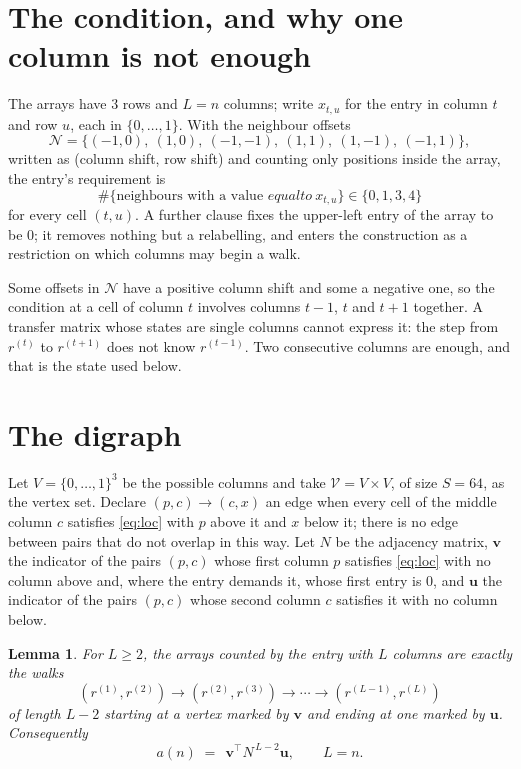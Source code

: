 \documentclass[11pt,a4paper]{article}
\theoremstyle{plain}
\newtheorem{lemma}[theorem]{Lemma}
\theoremstyle{definition}
\begin{document}
\section{The condition, and why one column is not enough}

The arrays have $3$ rows and $L=n$ columns; write $x_{t,u}$ for the entry in
column $t$ and row $u$, each in $\{0,\dots,1\}$. With the neighbour offsets
\[
\mathcal N=\{(-1,0),\ (1,0),\ (-1,-1),\ (1,1),\ (1,-1),\ (-1,1)\},
\]
written as (column shift, row shift) and counting only positions inside the array, the
entry's requirement is
\begin{equation}\label{eq:loc}
\#\{\text{neighbours with a value }equal to\ x_{t,u}\}\in\{0,1,3,4\}
\end{equation}
for every cell $(t,u)$. A further clause fixes the upper-left entry of the array to be $0$; it removes nothing but a relabelling, and enters the construction as a restriction on which columns may begin a walk.

Some offsets in $\mathcal N$ have a positive column shift and some a negative one, so the
condition at a cell of column $t$ involves columns $t-1$, $t$ and $t+1$ together. A transfer
matrix whose states are single columns cannot express it: the step from $r^{(t)}$ to
$r^{(t+1)}$ does not know $r^{(t-1)}$. Two consecutive columns are enough, and that is
the state used below.

\section{The digraph}

Let $V=\{0,\dots,1\}^{3}$ be the possible columns and take
$\mathcal V=V\times V$, of size $S=64$, as the vertex set. Declare $(p,c)\to(c,x)$ an edge
when every cell of the middle column $c$ satisfies \eqref{eq:loc} with $p$ above it and $x$
below it; there is no edge between pairs that do not overlap in this way. Let $N$ be the
adjacency matrix, $\mathbf{v}$ the indicator of the pairs $(p,c)$ whose first column $p$
satisfies \eqref{eq:loc} with no column above and, where the entry demands it, whose first entry is $0$, and $\mathbf{u}$ the indicator of
the pairs $(p,c)$ whose second column $c$ satisfies it with no column below.

\begin{lemma}\label{lem:walk}
For $L\ge2$, the arrays counted by the entry with $L$ columns are exactly the walks
\[
(r^{(1)},r^{(2)})\to(r^{(2)},r^{(3)})\to\cdots\to(r^{(L-1)},r^{(L)})
\]
of length $L-2$ starting at a vertex marked by $\mathbf{v}$ and ending at one marked by
$\mathbf{u}$. Consequently
\[
a(n)\;=\;\,\mathbf{v}^{\!\top}N^{\,L-2}\mathbf{u},\qquad L=n .
\]
\end{lemma}
\end{document}

